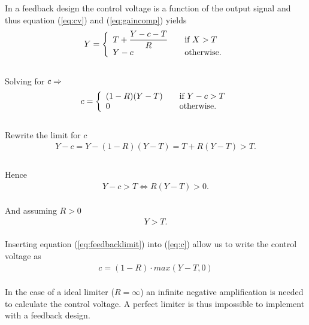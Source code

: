 \documentclass[]{article}
\begin{document}
In a feedback design the control voltage is a function of the output signal and thus equation (\ref{eq:cv}) and (\ref{eq:gaincomp}) yields
\begin{equation}
Y = \left\{ 
  \begin{array}{l l}
    T+ \dfrac{Y-c-T}{R} & \quad \text{if $X > T$}\\
    Y-c & \quad \text{otherwise.}
  \end{array} \right.
\end{equation}
\\Solving for $c \rm \Rightarrow$
\begin{equation} \label{eq:c}
c = \left\{ 
  \begin{array}{l l}
    (1-R)(Y-T)& \quad \text{if $Y-c > T$}\\
    0 & \quad \text{otherwise.}
  \end{array} \right.
\end{equation}
\\Rewrite the limit for $c$
\begin{align*}
Y - c  = Y-(1-R)(Y-T) = T + R(Y-T) > T.   \\
\end{align*}
\\Hence 
\begin{align*}
Y-c > T \Longleftrightarrow R(Y-T)  > 0.
\end{align*}
\\And assuming $R > 0$
\begin{align} \label{eq:feedbacklimit}
Y > T.
\end{align}
\\Inserting equation (\ref{eq:feedbacklimit}) into (\ref{eq:c}) allow us to write the control voltage as
\begin{align}
c = (1-R)\cdot max\left(Y-T,0\right)
\end{align}
\\In the case of a ideal limiter ($R = \infty$) an infinite negative amplification is needed to calculate the control voltage. A perfect limiter is thus impossible to implement with a feedback design.


\end{document}
